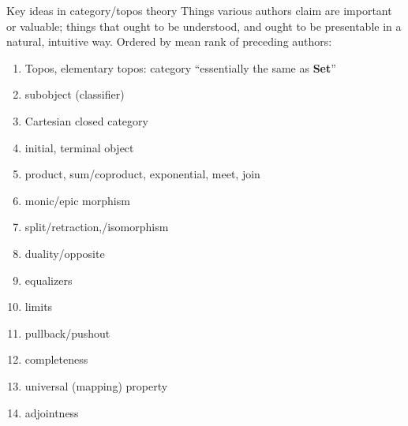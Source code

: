 \begin{plSection}{Key ideas in category/topos theory}
Things various authors claim are important or valuable;
things that ought to be understood,
and ought to be presentable in a natural, intuitive way.
Ordered by mean rank of preceding authors:
\begin{enumerate}
  \item Topos, elementary topos: 
  category ``essentially the same as \textbf{Set}''
  \item subobject (classifier)
  \item Cartesian closed category
  \item initial, terminal object
  \item product, sum/coproduct, exponential, meet, join
  \item monic/epic morphism
  \item split/retraction,/isomorphism
  \item duality/opposite
  \item equalizers
  \item limits
  \item pullback/pushout
  \item completeness
  \item universal (mapping) property
  \item adjointness
\end{enumerate}

\end{plSection}%
